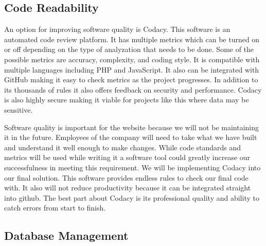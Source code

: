 \documentclass[letterpaper,10pt,titlepage,journal,compsoc,draftclsnofoot,onecolumn]{IEEEtran}
\newcommand\tab[1][1cm]{\hspace*{#1}}
\begin{document}
\subsection{Code Readability}

\tab An option for improving software quality is Codacy. This software is an automated code review platform. It has multiple metrics which can be turned on or off depending on the type of analyzation that needs to be done. Some of the possible metrics are accuracy, complexity, and coding style. It is compatible with multiple languages including PHP and JavaScript. It also can be integrated with GitHub making it easy to check metrics as the project progresses. In addition to its thousands of rules it also offers feedback on security and performance. Codacy is also highly secure making it viable for projects like this where data may be sensitive. \newline

\tab Software quality is important for the website because we will not be maintaining it in the future. Employees of the company will need to take what we have built and understand it well enough to make changes. While code standards and metrics will be used while writing it a software tool could greatly increase our successfulness in meeting this requirement. We will be implementing Codacy into our final solution. This software provides endless rules to check our final code with. It also will not reduce productivity because it can be integrated straight into github. The best part about Codacy is its professional quality and ability to catch errors from start to finish.

\subsection{Database Management}
\end{document}

